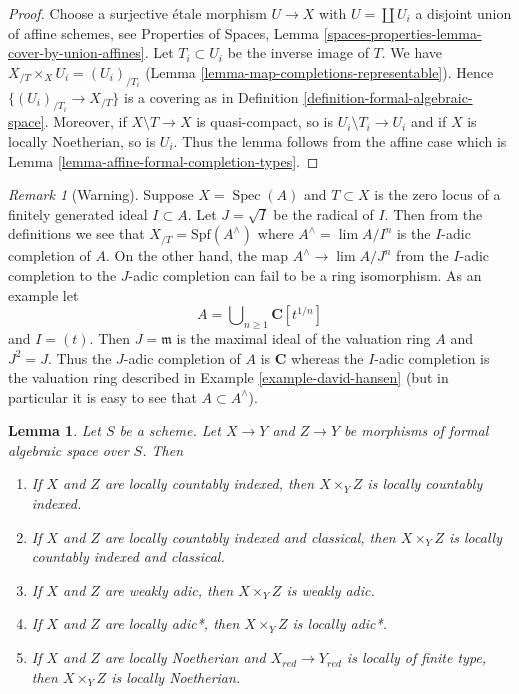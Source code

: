 \documentclass{stacks-project}
\theoremstyle{plain}
\newtheorem{lemma}[subsection]{Lemma}
\theoremstyle{definition}
\theoremstyle{remark}
\newtheorem{remark}[subsection]{Remark}
\numberwithin{equation}{subsection}
\def\lim{\mathop{\mathrm{lim}}\nolimits}
\def\Spec{\mathop{\mathrm{Spec}}}
\begin{document}
\begin{proof}
Choose a surjective \'etale morphism $U \to X$ with $U = \coprod U_i$
a disjoint union of affine schemes, see Properties of Spaces, Lemma
\ref{spaces-properties-lemma-cover-by-union-affines}.
Let $T_i \subset U_i$ be the inverse image of $T$.
We have $X_{/T} \times_X U_i = (U_i)_{/T_i}$
(Lemma \ref{lemma-map-completions-representable}).
Hence $\{(U_i)_{/T_i} \to X_{/T}\}$ is a covering as in
Definition \ref{definition-formal-algebraic-space}.
Moreover, if $X \setminus T \to X$ is quasi-compact, so is
$U_i \setminus T_i \to U_i$ and if $X$ is locally Noetherian, so is
$U_i$. Thus the lemma follows from the affine case which is
Lemma \ref{lemma-affine-formal-completion-types}.
\end{proof}

\begin{remark}[Warning]
\label{remark-warning-completion}
Suppose $X = \Spec(A)$ and $T \subset X$ is the zero locus of a
finitely generated ideal $I \subset A$. Let $J = \sqrt{I}$ be
the radical of $I$. Then from the definitions we see that
$X_{/T} = \text{Spf}(A^\wedge)$ where $A^\wedge = \lim A/I^n$ is
the $I$-adic completion of $A$. On the other hand, the map
$A^\wedge \to \lim A/J^n$ from the $I$-adic completion to
the $J$-adic completion can fail to be a ring isomorphism.
As an example let
$$
A = \bigcup\nolimits_{n \geq 1} \mathbf{C}[t^{1/n}]
$$
and $I = (t)$. Then $J = \mathfrak m$ is the maximal ideal
of the valuation ring $A$ and $J^2 = J$. Thus the $J$-adic completion
of $A$ is $\mathbf{C}$ whereas the $I$-adic completion
is the valuation ring described in Example \ref{example-david-hansen}
(but in particular it is easy to see that $A \subset A^\wedge$).
\end{remark}

\begin{lemma}
\label{lemma-types-fibre-products}
Let $S$ be a scheme. Let $X \to Y$ and $Z \to Y$ be
morphisms of formal algebraic space over $S$. Then
\begin{enumerate}
\item If $X$ and $Z$ are locally countably indexed, then $X \times_Y Z$
is locally countably indexed.
\item If $X$ and $Z$ are locally countably indexed and classical,
then $X \times_Y Z$ is locally countably indexed and classical.
\item If $X$ and $Z$ are weakly adic, then $X \times_Y Z$
is weakly adic.
\item If $X$ and $Z$ are locally adic*, then $X \times_Y Z$ is
locally adic*.
\item If $X$ and $Z$ are locally Noetherian and $X_{red} \to Y_{red}$
is locally of finite type, then $X \times_Y Z$ is locally Noetherian.
\end{enumerate}
\end{lemma}
\end{document}
